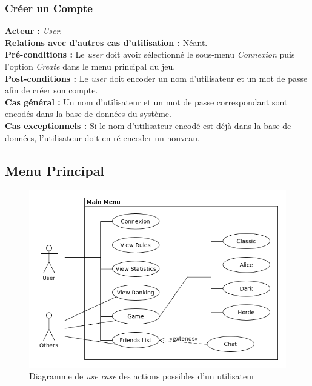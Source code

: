\documentclass[10pt, a4paper]{article}
\begin{document}
\subsubsection{Créer un Compte}
\textbf{Acteur :} \textit{User}.\\
\textbf{Relations avec d'autres cas d'utilisation :} Néant.\\
\textbf{Pré-conditions :} Le \textit{user} doit avoir sélectionné le sous-menu \textit{Connexion} puis l'option {\itshape Create} dans le menu principal du jeu.\\
\textbf{Post-conditions :} Le \textit{user} doit encoder un nom d'utilisateur et un mot de passe afin de créer son compte.\\
\textbf{Cas général :} Un nom d'utilisateur et un mot de passe correspondant sont encodés dans la base de données du système.\\
\textbf{Cas exceptionnels :} Si le nom d'utilisateur encodé est déjà dans la base de données, l'utilisateur doit en ré-encoder un nouveau.



\subsection{Menu Principal}

\begin{figure}[H]
\begin{center}
\includegraphics[scale=0.5]{UC_mainmenu.png}
\caption{Diagramme de \textit{use case} des actions possibles d'un utilisateur}
\label{UC_menu} %
\end{center}
\end{figure}
\end{document}
